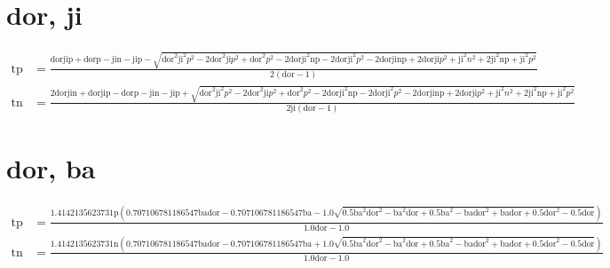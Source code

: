 \documentclass[3p,times]{elsarticle}
\begin{document}
\begin{footnotesize}
\begin{landscape}
\section{dor, ji}
\begin{align}
\mathrm{tp} &= \frac{\mathrm{dor} \mathrm{ji} \mathrm{p} + \mathrm{dor} \mathrm{p} - \mathrm{ji} \mathrm{n} - \mathrm{ji} \mathrm{p} - \sqrt{\mathrm{dor}^{2} \mathrm{ji}^{2} p^{2} - 2 \mathrm{dor}^{2} \mathrm{ji} p^{2} + \mathrm{dor}^{2} p^{2} - 2 \mathrm{dor} \mathrm{ji}^{2} \mathrm{n} \mathrm{p} - 2 \mathrm{dor} \mathrm{ji}^{2} p^{2} - 2 \mathrm{dor} \mathrm{ji} \mathrm{n} \mathrm{p} + 2 \mathrm{dor} \mathrm{ji} p^{2} + \mathrm{ji}^{2} n^{2} + 2 \mathrm{ji}^{2} \mathrm{n} \mathrm{p} + \mathrm{ji}^{2} p^{2}}}{2 \left(\mathrm{dor} - 1\right)}\\
\mathrm{tn} &= \frac{2 \mathrm{dor} \mathrm{ji} \mathrm{n} + \mathrm{dor} \mathrm{ji} \mathrm{p} - \mathrm{dor} \mathrm{p} - \mathrm{ji} \mathrm{n} - \mathrm{ji} \mathrm{p} + \sqrt{\mathrm{dor}^{2} \mathrm{ji}^{2} p^{2} - 2 \mathrm{dor}^{2} \mathrm{ji} p^{2} + \mathrm{dor}^{2} p^{2} - 2 \mathrm{dor} \mathrm{ji}^{2} \mathrm{n} \mathrm{p} - 2 \mathrm{dor} \mathrm{ji}^{2} p^{2} - 2 \mathrm{dor} \mathrm{ji} \mathrm{n} \mathrm{p} + 2 \mathrm{dor} \mathrm{ji} p^{2} + \mathrm{ji}^{2} n^{2} + 2 \mathrm{ji}^{2} \mathrm{n} \mathrm{p} + \mathrm{ji}^{2} p^{2}}}{2 \mathrm{ji} \left(\mathrm{dor} - 1\right)}
\end{align}
\section{dor, ba}
\begin{align}
\mathrm{tp} &= \frac{1.4142135623731 \mathrm{p} \left(0.707106781186547 \mathrm{ba} \mathrm{dor} - 0.707106781186547 \mathrm{ba} - 1.0 \sqrt{0.5 \mathrm{ba}^{2} \mathrm{dor}^{2} - \mathrm{ba}^{2} \mathrm{dor} + 0.5 \mathrm{ba}^{2} - \mathrm{ba} \mathrm{dor}^{2} + \mathrm{ba} \mathrm{dor} + 0.5 \mathrm{dor}^{2} - 0.5 \mathrm{dor}}\right)}{1.0 \mathrm{dor} - 1.0}\\
\mathrm{tn} &= \frac{1.4142135623731 \mathrm{n} \left(0.707106781186547 \mathrm{ba} \mathrm{dor} - 0.707106781186547 \mathrm{ba} + 1.0 \sqrt{0.5 \mathrm{ba}^{2} \mathrm{dor}^{2} - \mathrm{ba}^{2} \mathrm{dor} + 0.5 \mathrm{ba}^{2} - \mathrm{ba} \mathrm{dor}^{2} + \mathrm{ba} \mathrm{dor} + 0.5 \mathrm{dor}^{2} - 0.5 \mathrm{dor}}\right)}{1.0 \mathrm{dor} - 1.0}
\end{align}

\end{landscape}
\end{footnotesize}
\end{document}
